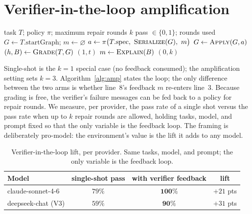 \documentclass[11pt]{article}
\begin{document}
\section{Verifier-in-the-loop amplification}
\label{sec:amp}

\begin{algorithm}[t]
\caption{$\textsc{Rollout}(T, \pi, k)$: verifier-in-the-loop repair}
\label{alg:amp}
\begin{algorithmic}[1]
\Require task $T$; policy $\pi$; maximum repair rounds $k$
\Ensure pass $\in\{0,1\}$; rounds used
\State $G \gets T.\text{startGraph}$; \quad $m \gets \varnothing$ 
  \State $a \gets \pi\big(T.\text{spec},\ \textsc{Serialize}(G),\ m\big)$ 
  \State $G \gets \textsc{Apply}(G, a)$
  \State $(h, B) \gets \textsc{Grade}(T, G)$
   \Return $(1, t)$ \EndIf
  \State $m \gets \textsc{Explain}(B)$ 
\EndFor
\State \Return $(0, k)$
\end{algorithmic}
\end{algorithm}

Single-shot is the $k{=}1$ special case (no feedback consumed); the amplification setting sets $k{=}3$. Algorithm~\ref{alg:amp} states the loop; the only difference between the two arms is whether line~8's feedback $m$ re-enters line~3.
Because grading is free, the verifier's failure messages can be fed back to a policy for repair rounds. We measure, per provider, the pass rate of a single shot versus the pass rate when up to $k$ repair rounds are allowed, holding tasks, model, and prompt fixed so that the only variable is the feedback loop. The framing is deliberately pro-model: the environment's value is the lift it adds to any model.

\begin{table}[h]
\centering
\begin{tabular}{lccc}
\toprule
Model & single-shot pass & with verifier feedback & lift \\
\midrule
claude-sonnet-4-6 & $79\%$ & $\mathbf{100\%}$ & $+21$ pts \\
deepseek-chat (V3) & $59\%$ & $\mathbf{90\%}$ & $+31$ pts \\
\bottomrule
\end{tabular}
\caption{Verifier-in-the-loop lift, per provider. Same tasks, model, and prompt; the only variable is the feedback loop.}
\end{table}
\end{document}
